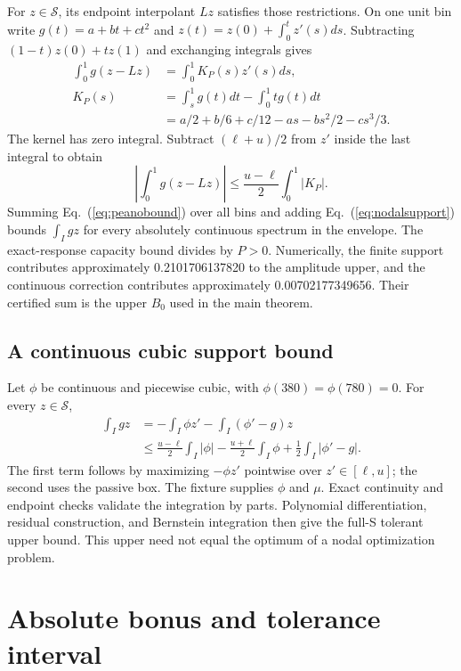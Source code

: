\documentclass[9pt]{osa-supplemental-document}
\renewcommand{\eqref}[1]{\textup{(\ref{#1})}}
\begin{document}
For $z\in\mathcal S$, its endpoint interpolant $Lz$ satisfies those restrictions. On one unit bin write $g(t)=a+bt+ct^2$ and $z(t)=z(0)+\int_0^t z'(s)ds$. Subtracting $(1-t)z(0)+tz(1)$ and exchanging integrals gives
\begin{align}
 \int_0^1g(z-Lz)&=\int_0^1 K_P(s)z'(s)ds,\\
 K_P(s)&=\int_s^1g(t)dt-\int_0^1tg(t)dt\\
 &=a/2+b/6+c/12-as-bs^2/2-cs^3/3.
\end{align}
The kernel has zero integral. Subtract $(\ell+u)/2$ from $z'$ inside the last integral to obtain
\begin{equation}
 \left|\int_0^1g(z-Lz)\right|\leq\frac{u-\ell}{2}\int_0^1|K_P|.
 \label{eq:peanobound}
\end{equation}
Summing Eq.~\eqref{eq:peanobound} over all bins and adding Eq.~\eqref{eq:nodalsupport} bounds $\int_Igz$ for every absolutely continuous spectrum in the envelope. The exact-response capacity bound divides by $P>0$. Numerically, the finite support contributes approximately 0.2101706137820 to the amplitude upper, and the continuous correction contributes approximately 0.00702177349656. Their certified sum is the upper $B_0$ used in the main theorem.

\subsection{A continuous cubic support bound}
Let $\phi$ be continuous and piecewise cubic, with $\phi(380)=\phi(780)=0$. For every $z\in\mathcal S$,
\begin{align}
 \int_Igz&=-\int_I\phi z'-\int_I(\phi'-g)z\\
 &\leq\frac{u-\ell}{2}\int_I|\phi|
 -\frac{u+\ell}{2}\int_I\phi+\frac12\int_I|\phi'-g|.
 \label{eq:cubicsupport}
\end{align}
The first term follows by maximizing $-\phi z'$ pointwise over $z'\in[\ell,u]$; the second uses the passive box. The fixture supplies $\phi$ and $\mu$. Exact continuity and endpoint checks validate the integration by parts. Polynomial differentiation, residual construction, and Bernstein integration then give the full-S tolerant upper bound. This upper need not equal the optimum of a nodal optimization problem.

\section{Absolute bonus and tolerance interval}
\end{document}
